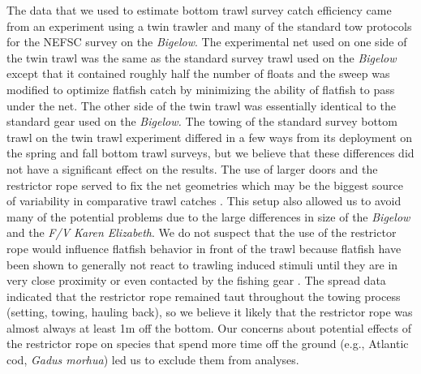 \documentclass[
  12pt,
]{article}
\begin{document}
The data that we used to estimate bottom trawl survey catch efficiency
came from an experiment using a twin trawler and many of the standard
tow protocols for the NEFSC survey on the \emph{Bigelow}. The
experimental net used on one side of the twin trawl was the same as the
standard survey trawl used on the \emph{Bigelow} except that it
contained roughly half the number of floats and the sweep was modified
to optimize flatfish catch by minimizing the ability of flatfish to pass
under the net. The other side of the twin trawl was essentially
identical to the standard gear used on the \emph{Bigelow.} The towing of
the standard survey bottom trawl on the twin trawl experiment differed
in a few ways from its deployment on the spring and fall bottom trawl
surveys, but we believe that these differences did not have a
significant effect on the results. The use of larger doors and the
restrictor rope served to fix the net geometries which may be the
biggest source of variability in comparative trawl catches
\citep{jonesetal21}. This setup also allowed us to avoid many of the
potential problems due to the large differences in size of the
\emph{Bigelow} and the \emph{F/V Karen Elizabeth}. We do not suspect
that the use of the restrictor rope would influence flatfish behavior in
front of the trawl because flatfish have been shown to generally not
react to trawling induced stimuli until they are in very close proximity
or even contacted by the fishing gear \citep{ryeretal10}. The spread
data indicated that the restrictor rope remained taut throughout the
towing process (setting, towing, hauling back), so we believe it likely
that the restrictor rope was almost always at least 1m off the bottom.
Our concerns about potential effects of the restrictor rope on species
that spend more time off the ground (e.g., Atlantic cod, \emph{Gadus
morhua}) led us to exclude them from analyses.
\end{document}
